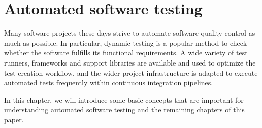 \chapter{Automated software testing}\label{chap:Testing}
Many software projects these days
strive to automate software quality control
as much as possible.
In particular, dynamic testing
is a popular method to check
whether the software fulfills
its functional requirements.
A wide variety of test runners,
frameworks and support libraries are
available and used to optimize
the test creation workflow,
and the wider project infrastructure
is adapted to execute automated tests frequently
within continuous integration pipelines.

In this chapter,
we will introduce some basic concepts
that are important for understanding
automated software testing and
the remaining chapters of this paper.












